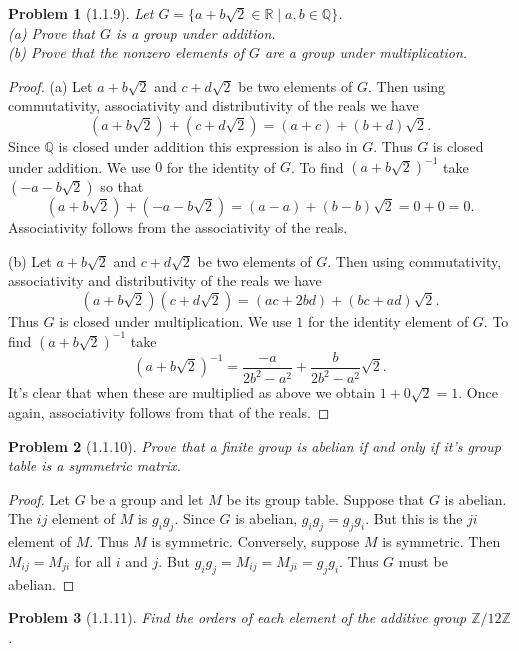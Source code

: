 \documentclass{article}
\newtheorem{problem}{Problem}
\begin{document}
\begin{problem}[1.1.9]
Let $G = \{a + b \sqrt{2} \in \mathbb{R} \mid a, b \in \mathbb{Q}\}$.\\
(a) Prove that $G$ is a group under addition.\\
(b) Prove that the nonzero elements of $G$ are a group under multiplication.
\end{problem}
\begin{proof}
(a) Let $a + b \sqrt{2}$ and $c + d \sqrt{2}$ be two elements of $G$. Then using commutativity, associativity and distributivity of the reals we have
\[
(a + b \sqrt{2}) + (c + d \sqrt{2}) = (a + c) + (b + d)\sqrt{2}.
\]
Since $\mathbb{Q}$ is closed under addition this expression is also in $G$. Thus $G$ is closed under addition. We use $0$ for the identity of $G$. To find $(a + b \sqrt{2})^{-1}$ take $(-a - b \sqrt{2})$ so that
\[
(a + b \sqrt{2}) + (-a - b \sqrt{2}) = (a - a) + (b - b)\sqrt{2} = 0 + 0 = 0.
\]
Associativity follows from the associativity of the reals.

(b)  Let $a + b \sqrt{2}$ and $c + d \sqrt{2}$ be two elements of $G$. Then using commutativity, associativity and distributivity of the reals we have
\[
(a + b \sqrt{2})(c + d \sqrt{2}) = (ac + 2bd) + (bc + ad)\sqrt{2}.
\]
Thus $G$ is closed under multiplication. We use $1$ for the identity element of $G$. To find $(a + b \sqrt{2})^{-1}$ take
\[
(a + b \sqrt{2})^{-1} = \frac{-a}{2b^2 - a^2} + \frac{b}{2b^2 - a^2} \sqrt{2}.
\]
It's clear that when these are multiplied as above we obtain $1 + 0 \sqrt{2} = 1$. Once again, associativity follows from that of the reals.
\end{proof}

\begin{problem}[1.1.10]
Prove that a finite group is abelian if and only if it's group table is a symmetric matrix.
\end{problem}
\begin{proof}
Let $G$ be a group and let $M$ be its group table. Suppose that $G$ is abelian. The $ij$ element of $M$ is $g_ig_j$. Since $G$ is abelian, $g_ig_j = g_jg_i$. But this is the $ji$ element of $M$. Thus $M$ is symmetric. Conversely, suppose $M$ is symmetric. Then $M_{ij} = M_{ji}$ for all $i$ and $j$. But $g_ig_j = M_{ij} = M_{ji} = g_jg_i$. Thus $G$ must be abelian.
\end{proof}

\begin{problem}[1.1.11]
Find the orders of each element of the additive group $\mathbb{Z}/12\mathbb{Z}$.
\end{problem}
\end{document}

